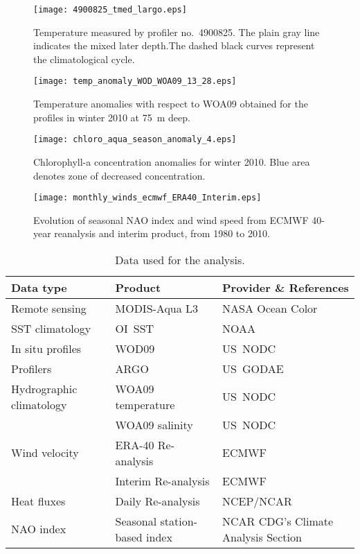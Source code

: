 \documentclass[12pt]{article}
\begin{document}
\begin{figure}[H]
\centering
\texttt{[image: 4900825\_tmed\_largo.eps]}
\caption{Temperature measured by profiler no.~4900825. The plain gray line indicates the mixed later depth.The dashed black curves represent the climatological cycle.\label{fig:4900825_tmed_largo}}
\end{figure} 


\begin{figure}[H]
\centering
\texttt{[image: temp\_anomaly\_WOD\_WOA09\_13\_28.eps]}
\caption{Temperature anomalies with respect to WOA09 obtained for the profiles in winter 2010 at 75~m deep.\label{fig:temp_anomaly_WOD_WOA09_13_28}}
\end{figure}

\begin{figure}[H]
\centering
\texttt{[image: chloro\_aqua\_season\_anomaly\_4.eps]}
\caption{Chlorophyll-a concentration anomalies for winter 2010. Blue area denotes zone of decreased concentration.\label{fig:chloro_aqua_season_anomaly_4}}
\end{figure}

\begin{figure}[H]
\centering
\texttt{[image: monthly\_winds\_ecmwf\_ERA40\_Interim.eps]}
\caption{Evolution of seasonal NAO index and wind speed from ECMWF 40-year reanalysis and interim product, from 1980 to 2010.\label{fig:monthly_winds_ecmwf_ERA40_Interim}}
\end{figure}





\begin{table}[H]
\centering
\footnotesize
\caption{Data used for the analysis. \label{tab:datasources}}
\begin{tabular}{lll}
\hline
Data type					& Product						  				& Provider	\& References\\
\hline
Remote sensing				& MODIS-Aqua L3 								& NASA Ocean Color \citep{FELDMAN10}\\
SST climatology				& OI~SST										& NOAA \citep{REYNOLDS02,SMITH08}	\\
In situ	profiles			& WOD09											& US~NODC \citep{BOYER09}			\\
Profilers				    & ARGO 											& US~GODAE							\\
Hydrographic climatology	& WOA09 temperature								& US~NODC \citep{LOCARNINI10}		\\
							& WOA09 salinity								& US~NODC \citep{ANTONOV10}			\\
Wind velocity   			& ERA-40 Re-analysis							& ECMWF	\citep{UPPALA05}			\\
							& Interim Re-analysis							& ECMWF \citep{SIMMONS06,UPPALA08}	\\
Heat fluxes					& Daily Re-analysis								& NCEP/NCAR \citep{KALNAY96}		\\
NAO index					& Seasonal station-based index					& NCAR CDG's Climate Analysis Section \citep{HURREL95} \\
\hline
\end{tabular}
\end{table}	
\end{document}
